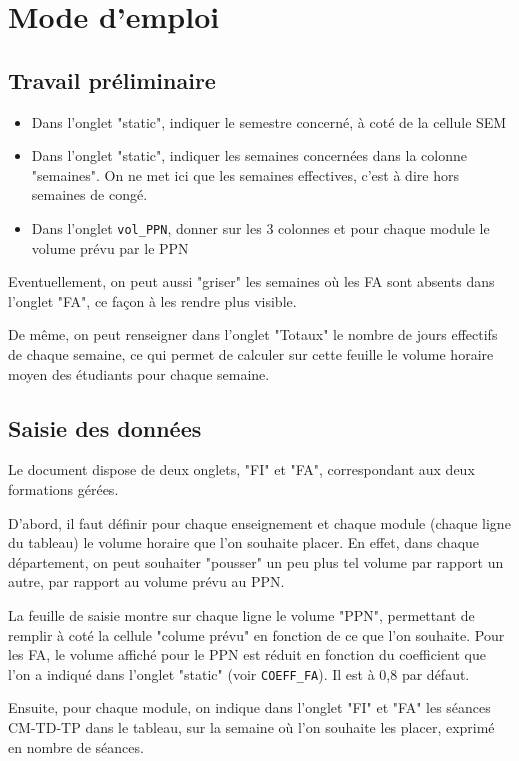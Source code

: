 \documentclass[12pt,a4paper]{article}
\begin{document}
\section{Mode d'emploi}

\subsection{Travail préliminaire}
\begin{itemize}
\item Dans l'onglet "static", indiquer le semestre concerné, à coté de la cellule SEM
\item Dans l'onglet "static", indiquer les semaines concernées dans la colonne "semaines".
On ne met ici que les semaines effectives, c'est à dire hors semaines de congé.

\item Dans l'onglet {\tt vol\_PPN}, donner sur les 3 colonnes et pour chaque module le volume prévu par le PPN
\end{itemize}

Eventuellement, on peut aussi "griser" les semaines où les FA sont absents dans l'onglet "FA", ce façon à les rendre plus visible.

De même, on peut renseigner dans l'onglet "Totaux" le nombre de jours effectifs de chaque semaine, ce qui permet de calculer sur cette feuille le volume horaire moyen des étudiants pour chaque semaine.


\subsection{Saisie des données}

Le document dispose de deux onglets, "FI" et "FA", correspondant aux deux formations gérées.

D'abord, il faut définir pour chaque enseignement et chaque module (chaque ligne du tableau) le volume horaire que l'on souhaite placer.
En effet, dans chaque département, on peut souhaiter "pousser" un peu plus tel volume par rapport un autre, par rapport au volume prévu au PPN.

La feuille de saisie montre sur chaque ligne le volume "PPN", permettant de remplir à coté la cellule "colume prévu" en fonction de ce que l'on souhaite.
Pour les FA, le volume affiché pour le PPN est réduit en fonction du coefficient que l'on a indiqué dans l'onglet "static"
(voir {\tt COEFF\_FA}).
Il est à 0,8 par défaut.

Ensuite, pour chaque module, on indique dans l'onglet "FI" et "FA" les séances CM-TD-TP dans le tableau, sur la semaine où l'on souhaite les placer, exprimé en nombre de séances.
\end{document}
